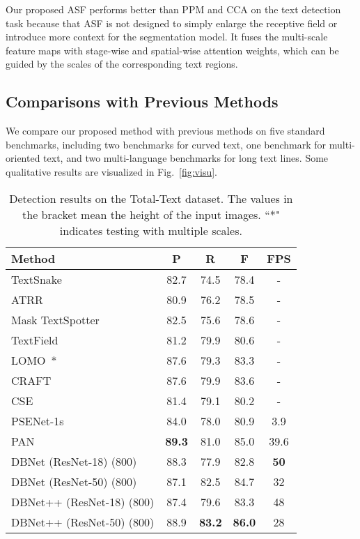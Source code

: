 Our proposed ASF performs better than PPM and CCA on the text detection task because that ASF is not designed to simply enlarge the receptive field or introduce more context for the segmentation model. It fuses the multi-scale feature maps with stage-wise and spatial-wise attention weights, which can be guided by the scales of the corresponding text regions.

\subsection{Comparisons with Previous Methods}
We compare our proposed method with previous methods on five standard benchmarks, including two benchmarks for curved text, one benchmark for multi-oriented text, and two multi-language benchmarks for long text lines. Some qualitative results are visualized in Fig.~\ref{fig:visu}.


\begin{table}[!ht]
\setlength{\tabcolsep}{10.0pt}
\centering
\caption{Detection results on the Total-Text dataset. The values in the bracket mean the height of the input images. ``*" indicates testing with multiple scales.}
\begin{tabularx}{1.0\linewidth}{lc*{3}c}
\toprule
Method           & P    & R    & F    & FPS \\ \midrule
TextSnake~\cite{long2018textsnake}      & 82.7 & 74.5 & 78.4 & -   \\ 
ATRR~\cite{atrr}            & 80.9 & 76.2 & 78.5 & -   \\ 
Mask TextSpotter~\cite{lyu2018mask} & 82.5 & 75.6 & 78.6 & -   \\ 
TextField~\cite{xu2019textfield}        & 81.2 & 79.9 & 80.6 & -   \\ 
LOMO~\cite{lomo}*        & 87.6 & 79.3 & 83.3 & -   \\ 
CRAFT~\cite{craft}           & 87.6 & 79.9 & 83.6 & -   \\ 
CSE~\cite{cse}              & 81.4 & 79.1 & 80.2 & -   \\ 
PSENet-1s~\cite{wang2019shape}        & 84.0   & 78.0   & 80.9 & 3.9 \\ 
PAN~\cite{wang2019efficient}        & \textbf{89.3}   & 81.0   & 85.0 & 39.6 \\ 
\midrule  
DBNet (ResNet-18) (800)~\cite{LiaoWYCB20}   & 88.3 & 77.9 & 82.8 & \textbf{50}  \\ 
DBNet (ResNet-50) (800)~\cite{LiaoWYCB20}  & 87.1 & 82.5 & 84.7 & 32  \\ 
\midrule
DBNet++ (ResNet-18) (800)   & 87.4 & 79.6 & 83.3 & 48  \\ 
DBNet++ (ResNet-50) (800)  & 88.9 & \textbf{83.2} & \textbf{86.0} & 28 \\ 
\bottomrule
\end{tabularx}
\label{tab:totaltext}
\end{table}


